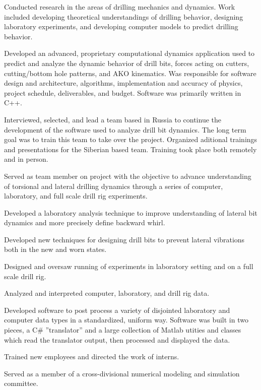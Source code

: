 \documentclass{resume}
\begin{document}
					\vspace*{-6pt}
					\noindent 
				Conducted research in the areas of drilling mechanics and dynamics.  Work included developing theoretical understandings of drilling behavior, designing laboratory experiments, and developing computer models to predict drilling behavior.
			
		\begin{bulletedlist}
			
		\item 
					Developed an advanced, proprietary computational dynamics application used to predict and analyze the dynamic behavior of drill bits,
					forces acting on cutters, cutting/bottom hole patterns, and AKO kinematics.  Was responsible for software design and architecture,
					algorithms, implementation and accuracy of physics, project schedule, deliverables, and budget.  Software was primarily written in C++.
				
		\item Interviewed, selected, and lead a team based in Russia to continue the development of the software used to analyze drill bit dynamics.  The long term goal was to train this team to take over the project.  Organized aditional trainings and presentations for the Siberian based team.  Training took place both remotely and in person.
		\item Served as team member on project with the objective to advance understanding of torsional and lateral drilling dynamics through a series of computer, laboratory, and full scale drill rig experiments.
		\item Developed a laboratory analysis technique to improve understanding of lateral bit dynamics and more precisely define backward whirl.
		\item Developed new techniques for designing drill bits to prevent lateral vibrations both in the new and worn states.
		\item Designed and oversaw running of experiments in laboratory setting and on a full scale drill rig.
		\item Analyzed and interpreted computer, laboratory, and drill rig data.
		\item 
					Developed software to post process a variety of disjointed laboratory and computer data types in a standardized, uniform
					way.  Software was built in two pieces, a C\# ''translator'' and a large collection of Matlab utities and classes which read
					the translator output, then processed and displayed the data.
				
		\item Trained new employees and directed the work of interns.
		\item Served as a member of a cross-divisional numerical modeling and simulation committee.
		\end{bulletedlist}
			\vspace*{-12pt}
	\hspace*{0pt}\\ \vspace*{-2pt}
				
\end{document}
